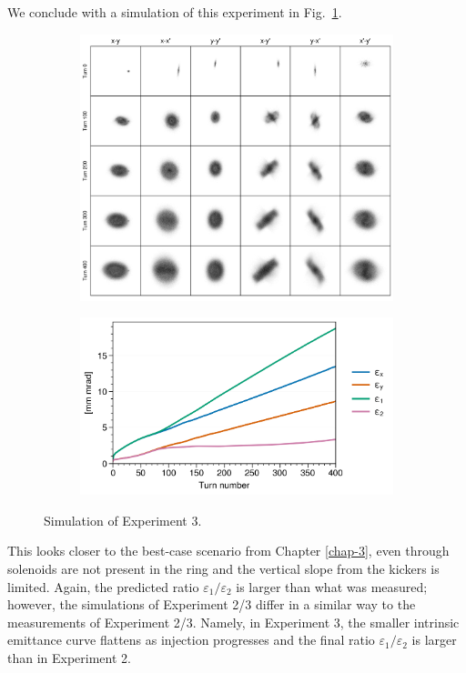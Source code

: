 We conclude with a simulation of this experiment in Fig.~\ref{fig:exp3_sim}.
%
\begin{figure}[!p]
    \centering
    \begin{subfigure}{0.85\textwidth}
        \includegraphics[width=\textwidth]{Images/chapter5/exp3/sim_snapshots.png}
    \end{subfigure}
    \vfill
    \vspace*{1.0cm}
    \vfill
    \begin{subfigure}{0.7\textwidth}
        \includegraphics[width=\textwidth]{Images/chapter5/exp3/sim_emittances.png}
    \end{subfigure}
    \caption{Simulation of Experiment 3.}
    \label{fig:exp3_sim}
\end{figure}
%
This looks closer to the best-case scenario from Chapter \ref{chap-3}, even through solenoids are not present in the ring and the vertical slope from the kickers is limited. Again, the predicted ratio $\varepsilon_1 / \varepsilon_2$ is larger than what was measured; however, the simulations of Experiment 2/3 differ in a similar way to the measurements of Experiment 2/3. Namely, in Experiment 3, the smaller intrinsic emittance curve flattens as injection progresses and the final ratio $\varepsilon_1 / \varepsilon_2$ is larger than in Experiment 2. 

